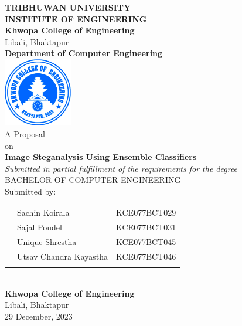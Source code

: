 \begin{center}
\thispagestyle{empty} %
\large{\bf{TRIBHUWAN UNIVERSITY \\ INSTITUTE OF ENGINEERING}}\\
\vspace{0.3cm}
\normalsize{\bf{Khwopa College of Engineering}} \\
\small{ Libali, Bhaktapur} \\
\normalsize{\bf{Department of Computer Engineering}} \\
\parskip 10mm
\includegraphics [width =30mm] {./img/Khwopalogo.jpg} \\
\vspace{0.3cm}
\normalsize{A Proposal \\ on} \\
\normalsize{\bf{Image Steganalysis Using Ensemble Classifiers  }} \\
\normalsize{\textit{Submitted in partial fulfillment of the requirements for the degree}}
\vspace{0.3cm} \\
\large{BACHELOR OF COMPUTER ENGINEERING}\\
\vspace{3.5cm}
Submitted by:\\
\begin{tabular}{p{0.5in}p{3.5in}p{3in}}
\hspace{0.3cm}&Sachin Koirala&KCE077BCT029\\
\hspace{0.3cm}&Sajal Poudel&KCE077BCT031\\
\hspace{0.3cm}&Unique Shrestha&KCE077BCT045\\
\hspace{0.3cm}&Utsav Chandra Kayastha&KCE077BCT046\\
\vspace{0.3cm}
\end{tabular}
\vspace{0.3cm} \\
\Large{\bf{Khwopa College of Engineering}}\\
\small{Libali, Bhaktapur}\\
\small{29 December, 2023}
\end{center}

